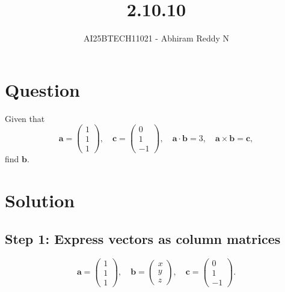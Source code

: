 \documentclass[journal]{IEEEtran}
\begin{document}

\vspace{3cm}

\title{2.10.10}
\author{AI25BTECH11021 - Abhiram Reddy N}
{\let\newpage\relax\maketitle}

\renewcommand{\thefigure}{\theenumi}
\renewcommand{\thetable}{\theenumi}
\setlength{\intextsep}{10pt} %


\renewcommand{\thetable}{\theenumi}


\section*{Question}

Given that
\[
\mathbf{a} = \begin{pmatrix} 1 \\ 1 \\ 1 \end{pmatrix}, \quad
\mathbf{c} = \begin{pmatrix} 0 \\ 1 \\ -1 \end{pmatrix}, \quad
\mathbf{a} \cdot \mathbf{b} = 3, \quad
\mathbf{a} \times \mathbf{b} = \mathbf{c},
\]
find \(\mathbf{b}\).

\section*{Solution}

\subsection*{Step 1: Express vectors as column matrices}

\[
\mathbf{a} = \begin{pmatrix} 1 \\ 1 \\ 1 \end{pmatrix}, \quad
\mathbf{b} = \begin{pmatrix} x \\ y \\ z \end{pmatrix}, \quad
\mathbf{c} = \begin{pmatrix} 0 \\ 1 \\ -1 \end{pmatrix}.
\]
\end{document}
